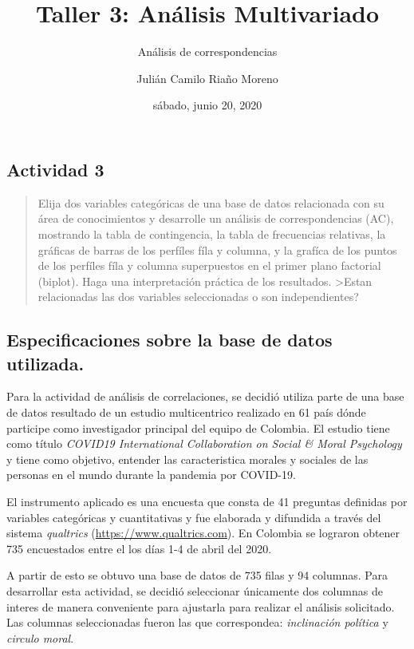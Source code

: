 \documentclass[
]{article}
\title{Taller 3: Análisis Multivariado}
\subtitle{Análisis de correspondencias}
\author{Julián Camilo Riaño Moreno}
\date{sábado, junio 20, 2020}
\begin{document}
\maketitle

{
\setcounter{tocdepth}{3}
\tableofcontents
}
\hypertarget{actividad-3}{%
\subsection{Actividad 3}\label{actividad-3}}

\begin{quote}
Elija dos variables categóricas de una base de datos relacionada con su
área de conocimientos y desarrolle un análisis de correspondencias (AC),
mostrando la tabla de contingencia, la tabla de frecuencias relativas,
la gráficas de barras de los perfíles fíla y columna, y la grafíca de
los puntos de los perfíles fíla y columna superpuestos en el primer
plano factorial (biplot). Haga una interpretación práctica de los
resultados. \textgreater Estan relacionadas las dos variables
seleccionadas o son independientes?
\end{quote}

\hypertarget{especificaciones-sobre-la-base-de-datos-utilizada.}{%
\subsection{Especificaciones sobre la base de datos
utilizada.}\label{especificaciones-sobre-la-base-de-datos-utilizada.}}

Para la actividad de análisis de correlaciones, se decidió utiliza parte
de una base de datos resultado de un estudio multicentrico realizado en
61 país dónde participe como investigador principal del equipo de
Colombia. El estudio tiene como título \emph{COVID19 International
Collaboration on Social \& Moral Psychology} y tiene como objetivo,
entender las caracteristica morales y sociales de las personas en el
mundo durante la pandemia por COVID-19.

El instrumento aplicado es una encuesta que consta de 41 preguntas
definidas por variables categóricas y cuantitativas y fue elaborada y
difundida a través del sistema \emph{qualtrics}
(\url{https://www.qualtrics.com}). En Colombia se lograron obtener 735
encuestados entre el los días 1-4 de abril del 2020.

A partir de esto se obtuvo una base de datos de 735 filas y 94 columnas.
Para desarrollar esta actividad, se decidió seleccionar únicamente dos
columnas de interes de manera conveniente para ajustarla para realizar
el análisis solicitado. Las columnas seleccionadas fueron las que
correspondea: \emph{inclinación política} y \emph{circulo moral}.
\end{document}
